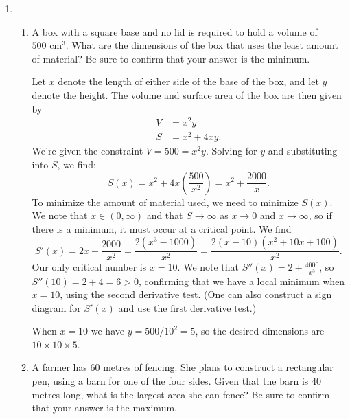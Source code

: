 \documentclass[12pt]{article}
\newcommand{\skipline}{\vspace{12pt}}
\begin{document}
\author{Instructor: Sean Fitzpatrick}



 \begin{enumerate}
 \item 
 \begin{enumerate}
 \item A box with a square base and no lid is required to hold a volume of $500 \text{ cm}^3$. What are the dimensions of the box that uses the least amount of material? Be sure to confirm that your answer is the minimum.
 
 \medskip
 
Let $x$ denote the length of either side of the base of the box, and let $y$ denote the height. The volume and surface area of the box are then given by
\begin{align*}
V & = x^2y\\
S & = x^2+4xy.
\end{align*}
We're given the constraint $V=500=x^2y$. Solving for $y$ and substituting into $S$, we find:
\[
S(x) = x^2+4x\left(\frac{500}{x^2}\right) = x^2 + \frac{2000}{x}.
\]
To minimize the amount of material used, we need to minimize $S(x)$. We note that $x\in (0,
\infty)$ and that $S\to\infty$ as $x\to 0$ and $x\to \infty$, so if there is a minimum, it must occur at a critical point. We find
\[
S'(x) = 2x-\frac{2000}{x^2} = \frac{2(x^3-1000)}{x^2} = \frac{2(x-10)(x^2+10x+100)}{x^2}.
\]
Our only critical number is $x=10$. We note that $S''(x)=2+\frac{4000}{x^3}$, so $S''(10)=2+4=6>0$, confirming that we have a local minimum when $x=10$, using the second derivative test. (One can also construct a sign diagram for $S'(x)$ and use the first derivative test.)

When $x=10$ we have $y=500/10^2 = 5$, so the desired dimensions are $10\times 10\times 5$.

\medskip


 \item A farmer has 60 metres of fencing. She plans to construct a rectangular pen, using a barn for one of the four sides. Given that the barn is 40 metres long, what is the largest area she can fence? Be sure to confirm that your answer is the maximum.
 

\end{enumerate}
\end{enumerate}
\end{document}
